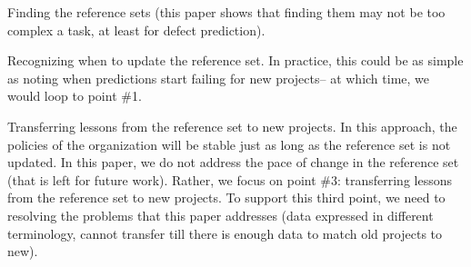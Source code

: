 \item Finding the reference sets (this paper shows that finding
  them may not be too complex a task, at least for defect prediction).
  \item Recognizing when to update  the reference set. In practice,
  this could be as simple as noting when predictions start failing for new projects-- at which time, we would loop to point \#1.
\item Transferring
  lessons from the reference set to new projects.  
\squishend
In this approach, the policies of the organization will be
stable just as long as the reference set is not updated.
In this paper, we do not address the pace of change in the reference set
(that is left for future work).
Rather, we focus on point \#3: transferring lessons from
the reference set to new projects. To support this third point,
we need to  resolving the problems
  that this paper addresses (data expressed in different terminology,
  cannot transfer till there is enough data to match old projects to new).

  

